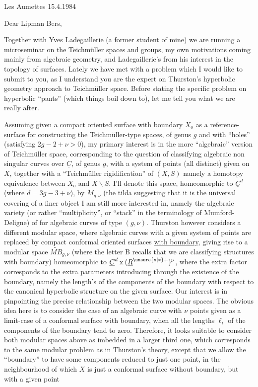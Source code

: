 \begin{flushright}Les Aumettes 15.4.1984\end{flushright}

Dear Lipman Bers,

Together with Yves Ladegaillerie (a former student of mine) we are running a microseminar on the Teichmüller spaces and groups, my own motivations coming mainly from algebraic geometry, and Ladegaillerie's from his interest in the topology of surfaces. Lately we have met with a problem which I would like to submit to you, as I understand you are the  expert on Thurston's hyperbolic geometry approach to Teichmüller space. Before stating the specific problem on hyperbolic ``pants'' (which things boil down to), let me tell you what we are really after.

Assuming given a compact oriented surface with boundary $X_o$  as a reference-surface for constructing the Teichmüller-type spaces, of genus $g$ and with \hspace{0.5cm} ``holes'' (satisfying $2g-2+\nu>0$), my primary interest is in the more ``algebraic'' version of Teichmüller space, corresponding to the question of classifying algebraic non singular curves over $\underline{C}$, of genus $g$, with a system of \hspace{0.5cm} points (all distinct) given on $X$, together with a ``Teichmüller rigidification'' of $(X,S)$ namely a homotopy equivalence between $X_o$ and $X\backslash S$. I'll denote this space, homeomorphic to $\underline{C}^{d}$ (where $d=3g-3+\nu$), by $\widetilde M_{g,\nu}$ (the tilda suggesting that it is the universal covering of a finer object I am still more interested in, namely the algebraic variety (or rather ``multiplicity'', or ``stack'' in the terminology of Mumford-Deligne) of  for algebraic curves of type $(g,\nu)$.
Thurston however considers a different modular space, where algebraic curves with a given system of points are replaced by compact conformal oriented surfaces \uline{with boundary}, giving rise to a modular space $\widetilde{MB}_{g,\nu}$ (where the letter B recalls that we are classifying structures with boundary) homeomorphic to $\underline{C}^{d}\mathbin{\mathrm{x}}(\underline{R}^{\unsure{\mathrm{x}|*}+})^{\nu}$, where the extra factor  corresponds to the extra parameters introducing through the existence of the boundary, namely the length's of the  components of the boundary with respect to the canonical hyperbolic structure on the given surface. Our interest is in pinpointing the precise relationship between the two modular spaces. The obvious idea here is to consider the case of an algebraic curve with $\nu$ points given as a limit-case of a  conformal surface with boundary, when all the lengths $\ell_i$ of the components of the boundary tend to zero. Therefore, it looks suitable to consider both modular spaces above as imbedded in a larger third one, which corresponds to the same modular problem as in Thurston's theory, except that we allow the ``boundary'' to have some components reduced to just one point, in the neighbourhood of which $X$ is just a conformal surface without boundary, but with a given point
